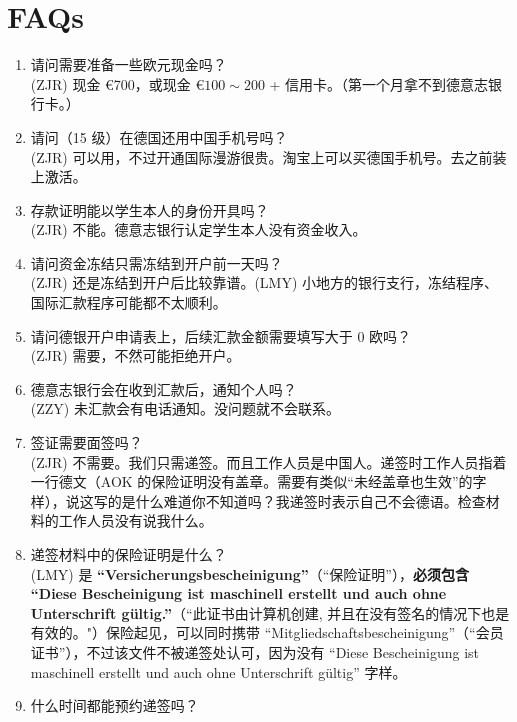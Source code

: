 
% 
\section{FAQs}\label{chap:faq}
\begin{enumerate}
  \item 请问需要准备一些欧元现金吗？ \\
  (ZJR) 现金 \euro{700}，或现金 \euro{$100 \sim 200$} + 信用卡。（第一个月拿不到德意志银行卡。）
  \item 请问（15 级）在德国还用中国手机号吗？ \\
  (ZJR) 可以用，不过开通国际漫游很贵。淘宝上可以买德国手机号。去之前装上激活。
  \item 存款证明能以学生本人的身份开具吗？ \\
  (ZJR) 不能。德意志银行认定学生本人没有资金收入。
  \item 请问资金冻结只需冻结到开户前一天吗？ \\
  (ZJR) 还是冻结到开户后比较靠谱。(LMY) 小地方的银行支行，冻结程序、国际汇款程序可能都不太顺利。
  \item 请问德银开户申请表上，后续汇款金额需要填写大于 0 欧吗？ \\
  (ZJR) 需要，不然可能拒绝开户。
  \item 德意志银行会在收到汇款后，通知个人吗？ \\
  (ZZY) 未汇款会有电话通知。没问题就不会联系。
  \item 签证需要面签吗？ \\
  (ZJR) 不需要。我们只需递签。而且工作人员是中国人。递签时工作人员指着一行德文（AOK 的保险证明没有盖章。需要有类似“未经盖章也生效”的字样），说这写的是什么难道你不知道吗？我递签时表示自己不会德语。检查材料的工作人员没有说我什么。
  \item 递签材料中的保险证明是什么？ \\
  (LMY) 是 \textbf{``Versicherungsbescheinigung''}（“保险证明”），\textbf{必须包含 ``Diese Bescheinigung ist maschinell erstellt und auch ohne Unterschrift gültig.''}（“此证书由计算机创建, 并且在没有签名的情况下也是有效的。"）{\color{gray}保险起见，可以同时携带 ``Mitgliedschaftsbescheinigung''（“会员证书”），不过该文件不被递签处认可，因为没有 ``Diese Bescheinigung ist maschinell erstellt und auch ohne Unterschrift gültig'' 字样。}
  \item 什么时间都能预约递签吗？ \\

\end{enumerate}
